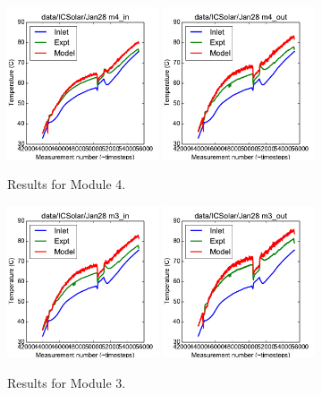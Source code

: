 \documentclass{article}
\begin{document}
\clearpage
\begin{figure}[!ht]
\centering
\includegraphics[width=0.4\textwidth]{../../data/ICSolar/images/Jan28_m4_in_unsteady.pdf}\hspace{0.05\textwidth}
\includegraphics[width=0.4\textwidth]{../../data/ICSolar/images/Jan28_m4_out_unsteady.pdf}\hspace{0.05\textwidth}\\
\caption{Results for Module 4.}\end{figure}
\begin{figure}[!ht]
\centering
\includegraphics[width=0.4\textwidth]{../../data/ICSolar/images/Jan28_m3_in_unsteady.pdf}\hspace{0.05\textwidth}
\includegraphics[width=0.4\textwidth]{../../data/ICSolar/images/Jan28_m3_out_unsteady.pdf}\hspace{0.05\textwidth}\\
\caption{Results for Module 3.}\end{figure}
\end{document}

